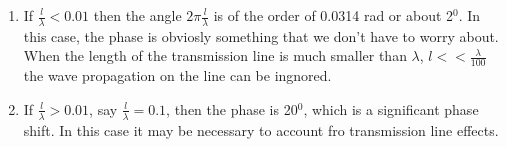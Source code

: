 \documentclass{ximera}
\begin{document}
\begin{example}
\begin{enumerate}
\item If $\frac{l}{\lambda} < 0.01$ then the angle $2 \pi
\frac{l}{\lambda}$ is of the order of 0.0314 rad or about 2$^0$. In this case, the
phase is obviosly something that we don't have to worry about. When
the length of the transmission line is much smaller than $\lambda$, $l<<\frac{\lambda}{100}$
the wave propagation on the line can be ingnored.
\item If  $\frac{l}{\lambda} > 0.01$, say  $\frac{l}{\lambda} =0.1$,
then the phase is 20$^0$, which is a significant phase shift. In this
case it may be necessary to account fro transmission line effects.
\end{enumerate}

\end{example}












%                   

  
\end{document}
